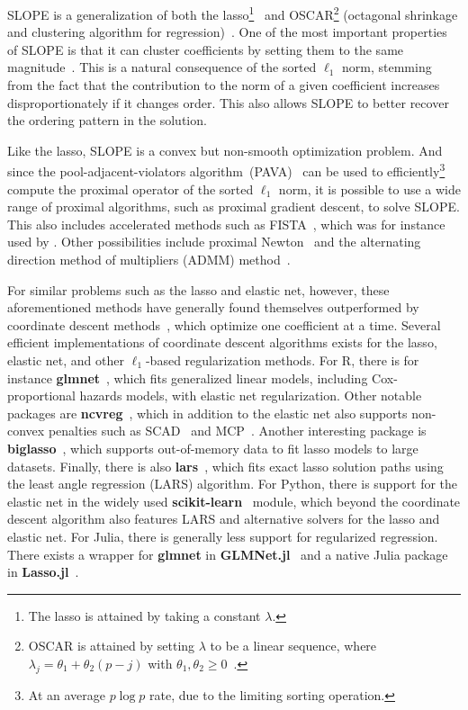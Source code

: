 \documentclass[a4paper,fleqn]{cas-sc}
\begin{document}
SLOPE is a generalization of both the lasso\footnote{The lasso is attained by
taking a constant \(\lambda\).}~\citep{santosa1986, donoho1994, donoho1995,
tibshirani1996} and OSCAR\footnote{OSCAR is attained by setting \(\lambda\) to
be a linear sequence, where \(\lambda_j = \theta_1 + \theta_2(p - j)\) with
\(\theta_1, \theta_2 \geq 0\)~\citep{figueiredo2014}.} (octagonal shrinkage and
clustering algorithm for regression)~\citep{bondell2008}. One of the most
important properties of SLOPE is that it can cluster coefficients by setting
them to the same magnitude~\citep{figueiredo2016, hejny2025, bogdan2026}. This
is a natural consequence of the sorted \(\ell_1\) norm, stemming from the fact
that the contribution to the norm of a given coefficient increases
disproportionately if it changes order. This also allows SLOPE to better recover
the ordering pattern in the solution.

Like the lasso, SLOPE is a convex but non-smooth optimization problem. And since
the pool-adjacent-violators algorithm~(PAVA)~\citep{barlow1972} can be used to
efficiently\footnote{At an average \(p \log p\) rate, due to the limiting
sorting operation.} compute the proximal operator of the sorted \(\ell_1\) norm,
it is possible to use a wide range of proximal algorithms, such as proximal
gradient descent, to solve SLOPE\@. This also includes accelerated methods such
as FISTA~\citep{beck2009}, which was for instance used by \citet{bogdan2015}.
Other possibilities include proximal Newton~\citep{lee2014} and the alternating
direction method of multipliers (ADMM) method~\citep{boyd2010}.

For similar problems such as the lasso and elastic net\citep{zou2005}, however,
these aforementioned methods have generally found themselves outperformed by
coordinate descent methods~\citep{friedman2007, friedman2010}, which optimize
one coefficient at a time. Several efficient implementations of coordinate
descent algorithms exists for the lasso, elastic net, and other \(\ell_1\)-based
regularization methods. For \textsf{R}, there is for instance
\textbf{glmnet}~\citep{friedman2010}, which fits generalized linear models,
including Cox-proportional hazards models, with elastic net regularization.
Other notable packages are \textbf{ncvreg}~\citep{breheny2011}, which in
addition to the elastic net also supports non-convex penalties such as
SCAD~\citep{fan2001} and MCP~\citep{zhang2010}. Another interesting package is
\textbf{biglasso}~\citep{zeng2021}, which supports out-of-memory data to fit
lasso models to large datasets. Finally, there is also
\textbf{lars}~\citep{efron2004}, which fits exact lasso solution paths using the
least angle regression (LARS) algorithm. For \textsf{Python}, there is support
for the elastic net in the widely used
\textbf{scikit-learn}~\citep{pedregosa2011} module, which beyond the coordinate
descent algorithm also features LARS and alternative solvers for the lasso and
elastic net. For \textsf{Julia}, there is generally less support for regularized
regression. There exists a wrapper for \textbf{glmnet} in
\textbf{GLMNet.jl}~\citep{kornblith2024a} and a native \textsf{Julia} package in
\textbf{Lasso.jl}~\citep{kornblith2024}.
\end{document}
